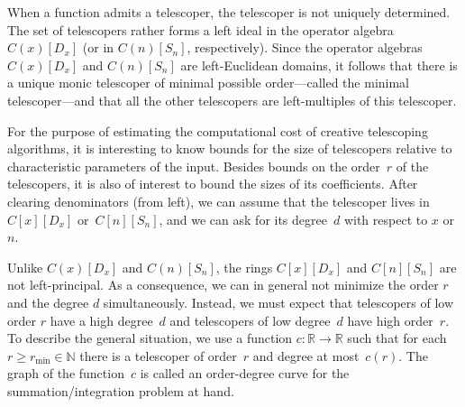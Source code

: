 \documentclass{jssc}
\let\set\mathbb
\begin{document}
 When a function admits a telescoper, the telescoper is not uniquely determined. The set of telescopers
 rather forms a left ideal in the operator algebra $C(x)[D_x]$ (or in $C(n)[S_n]$, respectively).
 Since the operator algebras $C(x)[D_x]$ and $C(n)[S_n]$ are left-Euclidean domains, it follows that
 there is a unique monic telescoper of minimal possible order---called the minimal telescoper---and that
 all the other telescopers are left-multiples of this telescoper.

 For the purpose of estimating the computational cost of creative telescoping algorithms, it is interesting
 to know bounds for the size of telescopers relative to characteristic parameters of the input.
 Besides bounds on the order~$r$ of the telescopers, it is also of interest to bound the sizes of its
 coefficients. After clearing denominators (from left), we can assume that the telescoper lives in
 $C[x][D_x]$ or~$C[n][S_n]$, and we can ask for its degree~$d$ with respect to $x$ or~$n$.

 Unlike $C(x)[D_x]$ and $C(n)[S_n]$, the rings $C[x][D_x]$ and $C[n][S_n]$ are not left-principal. As a
 consequence, we can in general not minimize the order $r$ and the degree $d$ simultaneously. Instead,
 we must expect that telescopers of low order $r$ have a high degree~$d$ and telescopers of low degree~$d$
 have high order~$r$. To describe the general situation, we use a function $c\colon\set R\to\set R$ such
 that for each $r\geq r_{\min}\in\set N$ there is a telescoper of order~$r$ and degree at most~$c(r)$.
 The graph of the function~$c$ is called an order-degree curve for the summation/integration problem at hand.
\end{document}

